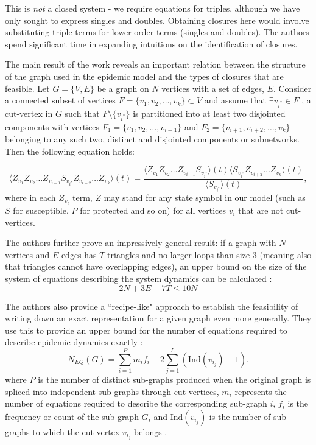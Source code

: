 \documentclass[../report.tex]{subfiles}
\begin{document}
This is {\it not} a closed system - we require equations for triples, although we have only sought to express singles and doubles. Obtaining closures here would involve substituting triple terms for lower-order terms (singles and doubles). The authors spend significant time in \cite{kiss_2014} expanding intuitions on the identification of closures.

The main result of the work reveals an important relation between the structure of the graph used in the epidemic model and the types of closures that are feasible. Let $G = \{V, E\}$ be a graph on $N$ vertices with a set of edges, $E$. Consider a connected subset of vertices $F = \{v_1, v_2, \dots, v_k\} \subset V$ and assume that $\exists v_{i^*} \in F$ , a cut-vertex in $G$ such that $F \setminus \{ v_{i^*} \}$ is partitioned into at least two disjointed components with vertices $F_1 = \{ v_1, v_2, \dots, v_{i-1} \}$ and $F_2 = \{ v_{i+1}, v_{i+2}, \dots, v_k \}$ belonging to any such two, distinct and disjointed components or subnetworks. Then the following equation holds:

$$
\langle Z_{v_1} Z_{v_2} \dots Z_{v_{i-1}} S_{v_{i^*}} Z_{v_{i+2}} \dots Z_{v_k} \rangle (t) = \frac{\langle Z_{v_1} Z_{v_2} \dots Z_{v_{i-1}} S_{v_{i^*}} \rangle (t) \langle S_{v_{i^*}} Z_{v_{i+2}} \dots Z_{v_k} \rangle (t)}{\langle S_{v_{i^*}} \rangle (t)},
$$
where in each $Z_{v_i}$ term, $Z$ may stand for any state symbol in our model (such as $S$ for susceptible, $P$ for protected and so on) for all vertices $v_i$ that are not cut-vertices.

The authors further prove an impressively general result: if a graph with $N$ vertices and  $E$ edges has $T$ triangles and no larger loops than size 3 (meaning also that triangles cannot have overlapping edges), an upper bound on the size of the system of equations describing the system dynamics can be calculated \cite{kiss_2014}:
$$
2N + 3E + 7T \leq 10N
$$

The authors also provide a ``recipe-like" approach to establish the feasibility of writing down an exact representation for a given graph even more generally. They use this to provide an upper bound for the number of equations required to describe epidemic dynamics exactly \cite{kiss_2014}:
$$
\displaystyle N_{EQ}(G)=\sum^P_{i=1}m_if_i - 2\sum^{L}_{j=1}(\text{Ind}(v_{i_j})-1).
$$
where $P$ is the number of distinct sub-graphs produced when the original graph is spliced into independent sub-graphs through cut-vertices, $m_i$ represents the number of equations required to describe the corresponding sub-graph $i$, $f_i$ is the frequency or count of the sub-graph $G_i$ and $\text{Ind}(v_{i_j})$ is the number of sub-graphs to which the cut-vertex $v_{i_j}$ belongs \cite{kiss_2014}.
\end{document}
